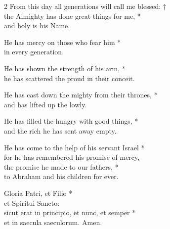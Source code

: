 

\begin{multicols}{2}
    \small
    From this day all generations will call me blessed: †\\
    the Almighty has done great things for me, *\\
    and holy is his Name.
    
    He has mercy on those who fear him *\\
    in every generation.
    
    He has shown the strength of his arm, *\\
    he has scattered the proud in their conceit.
    
    He has cast down the mighty from their thrones, *\\
    and has lifted up the lowly.
    
    He has filled the hungry with good things, *\\
    and the rich he has sent away empty.
    
    He has come to the help of his servant Israel *\\
    for he has remembered his promise of mercy,\\
    the promise he made to our fathers, *\\
    to Abraham and his children for ever.
    
    Gloria Patri, et Filio *\\
    et Spiritui Sancto:\\
    sicut erat in principio, et nunc, et semper *\\
    et in saecula saeculorum. Amen.       
\end{multicols}
